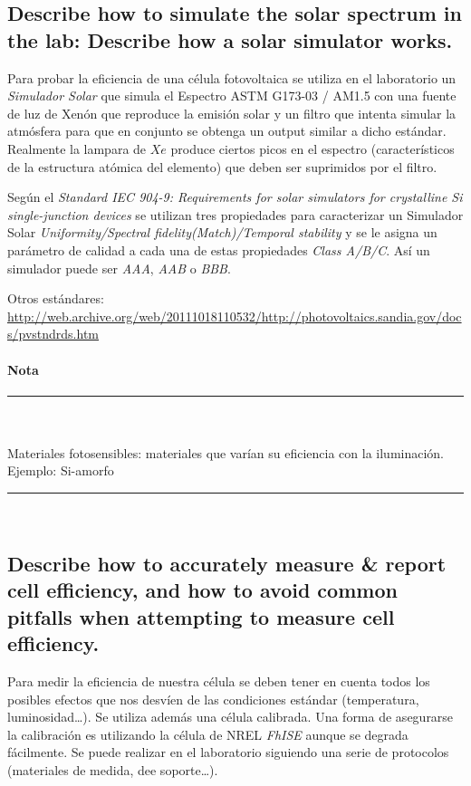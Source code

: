 \subsection{Describe how to simulate the solar spectrum in the lab: Describe how a solar simulator works.}
Para probar la eficiencia de una célula fotovoltaica se utiliza en el laboratorio un {\em Simulador Solar} que simula el Espectro ASTM G173-03 / AM1.5 con una fuente de luz de Xenón que reproduce la emisión solar y un filtro que intenta simular la atmósfera para que en conjunto se obtenga un output similar a dicho estándar. Realmente la lampara de $ Xe $ produce ciertos picos en el espectro (característicos de la estructura atómica del elemento) que deben ser suprimidos por el filtro.

Según el {\em Standard IEC 904-9: Requirements for solar simulators for crystalline Si single-junction devices} se utilizan tres propiedades para caracterizar un Simulador Solar {\em Uniformity/Spectral fidelity(Match)/Temporal stability} y se le asigna un parámetro de calidad a cada una de estas propiedades {\em Class A/B/C}. Así un simulador puede ser {\em AAA}, {\em AAB} o {\em BBB}. 

Otros estándares: \url{http://web.archive.org/web/20111018110532/http://photovoltaics.sandia.gov/docs/pvstndrds.htm}
{\paragraph{Nota}	
	{\rule{0.9\textwidth}{1pt} \\\\
		Materiales fotosensibles: materiales que varían su eficiencia con la iluminación. Ejemplo: Si-amorfo\\
		\rule{0.99\textwidth}{1pt}\\}}

\subsection{Describe how to accurately measure \& report cell efficiency, and how to avoid common pitfalls when attempting to measure cell efficiency.}
Para medir la eficiencia de nuestra célula se deben tener en cuenta todos los posibles efectos que nos desvíen de las condiciones estándar (temperatura, luminosidad\dots). Se utiliza además una célula calibrada. Una forma de asegurarse la calibración es utilizando la célula de NREL {\em FhISE} aunque se degrada fácilmente. Se puede realizar en el laboratorio siguiendo una serie de protocolos (materiales de medida, dee soporte\dots).


